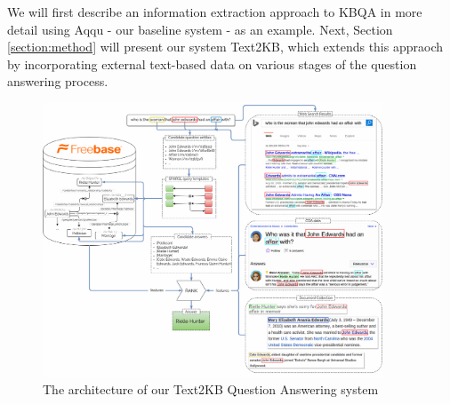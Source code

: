 
We will first describe an information extraction approach to KBQA in more detail using Aqqu - our baseline system - as an example. Next, Section \ref{section:method} will present our system Text2KB, which extends this appraoch by incorporating external text-based data on various stages of the question answering process.

\begin{figure}[!ht]
\centering
\includegraphics[width=0.9\textwidth]{img/Text2KB_model}
\vspace{-0.5cm}
\caption{The architecture of our Text2KB Question Answering system}
\label{fig:model}
\vspace{-0.5cm}
\end{figure}


